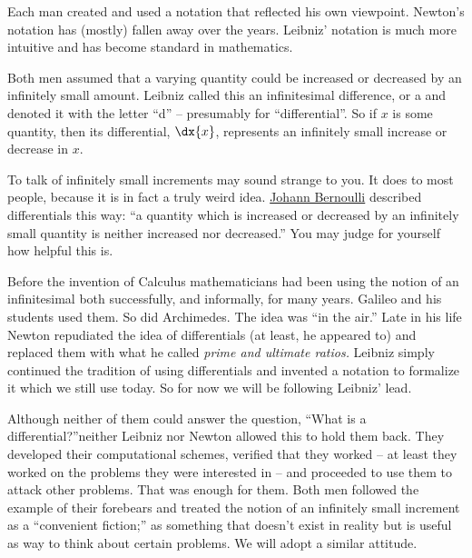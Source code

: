 Each man created and used a notation that reflected his own viewpoint.
Newton's notation has (mostly) fallen away over the years. Leibniz'
notation is much more intuitive and has become standard in
mathematics.

Both men assumed that a varying quantity could be increased or
decreased by an infinitely small amount. Leibniz called this an
infinitesimal difference, or a  and denoted it with
the letter ``d'' -- presumably for ``differential''.  So if $x$ is
some quantity, then its differential, $\dx{x}$, represents an
infinitely small increase or decrease in $x.$

To talk of infinitely small increments may sound strange to you. It
does to most people, because it is in fact a truly weird
idea. \href{https://mathshistory.st-andrews.ac.uk/Biographies/Bernoulli_Johann/}{Johann
  Bernoulli} described differentials this way:
``a quantity which is increased or decreased by an infinitely small
quantity is neither increased nor decreased.''  You may judge for
yourself how helpful this is.

Before the invention of Calculus mathematicians had been using the
notion of an infinitesimal both successfully, and informally, for many
years. Galileo and his students used them. So did Archimedes.  The
idea was ``in the air.''  Late in his life Newton repudiated the idea
of differentials (at least, he appeared to) and replaced them with
what he called \emph{prime and ultimate ratios.}  Leibniz simply
continued the tradition of using differentials and invented a notation
to formalize it which we still use today. So for now we will be following
Leibniz' lead.

Although neither of them could answer the question, ``What is a
differential?''neither Leibniz nor Newton allowed this to hold them
back. They developed their computational schemes, verified that they
worked -- at least they worked on the problems they were interested in
-- and proceeded to use
them to attack other problems. That was enough for them. Both men
followed the example of their forebears and treated the notion of an
infinitely small increment as a ``convenient fiction;'' as something
that doesn't exist in reality but is useful as way to think about
certain problems.  We will adopt a similar attitude.



